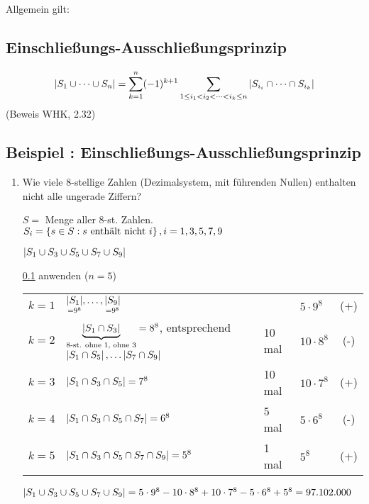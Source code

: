 Allgemein gilt:

\subsection{Einschließungs-Ausschließungsprinzip}
\label{subsec:einausschliessprinzip}

\[\abs{ S_1 \cup \dots \cup S_n} = \sum_{k=1}^n(-1)^{k+1} \sum_{1 \leq i_1 < i_2 < \dots < i_k \leq n}{\abs{S_{i_i} \cap \dots \cap S_{i_k}}} \]
(Beweis WHK, 2.32)

\subsection{Beispiel : Einschließungs-Ausschließungsprinzip}

\begin{enumerate}
	\item Wie viele 8-stellige Zahlen (Dezimalsystem, mit führenden Nullen) enthalten nicht alle ungerade Ziffern?
	
	$S =$ Menge aller 8-st. Zahlen.
	\\$S_i = \left\{s \in S : s \text{ enthält nicht } i\right\}, i = 1, 3, 5, 7, 9 $
	
	$\left|S_1 \cup S_3 \cup S_5 \cup S_7 \cup S_9\right|$
	
	\ref{subsec:einausschliessprinzip} anwenden 
	($n=5 $)
	
	\begin{tabular}{l@{ : }lllc}

	$k=1$ 
	& $\underset{=9^8}{\left|S_1\right|}, \dots, \underset{=9^8}{\left|S_9\right|}$
	&
	& $5 \cdot 9^8$ 
	& (+)\\
	
	
	$k=2$ 
	& $\underbrace{\left|S_1 \cap S_3\right|}_{\text{8-st. ohne 1, ohne 3}} = 8^8$, entsprechend $\left|S_1 \cap S_5\right|, \dots \left|S_7 \cap S_9\right|$ 
	& 10 mal 
	& $10 \cdot 8^8$ 
	&(-) \\
	
	$k=3$ 
	& $\left|S_1 \cap S_3 \cap S_5\right| = 7^8$ 
	& 10 mal 
	&$10 \cdot 7^8$ 
	&(+) \\
	
 	$k=4$
 	& $\left|S_1 \cap S_3 \cap S_5 \cap S_7\right| = 6^8$ 
 	& 5 mal 
 	& $5 \cdot 6^8$ 
 	& (-) \\
 	
 	$k=5$ 
 	& $\left|S_1 \cap S_3 \cap S_5 \cap S_7 \cap S_9\right| = 5^8$ 
 	& 1 mal 
 	& $5^8$ 
 	& (+) \\
	 \end{tabular}
 		
	
	$\left|S_1 \cup S_3 \cup S_5 \cup S_7 \cup S_9\right| = 5 \cdot 9^8 - 10 \cdot 8^8 + 10\cdot 7^8 - 5 \cdot 6^8 + 5^8 = 97.102.000$
	

\end{enumerate}
